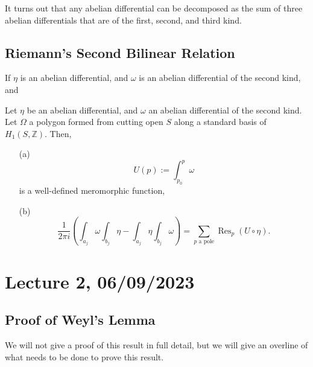 \documentclass[a4paper]{report}
\theoremstyle{definition}
\theoremstyle{remark}
\theoremstyle{proposition}
\theoremstyle{conjecture}
\theoremstyle{lemma}
\theoremstyle{corollary}
\theoremstyle{exercise}
\theoremstyle{example}
\newcommand{\diff}{\,\mathrm{d}}
\newcommand{\on}{\operatorname}
\begin{document}
It turns out that any abelian differential can be decomposed as the sum 
of three abelian differentials that are of the first, second, and third
kind.

\subsection{Riemann's Second Bilinear Relation}

If $\eta$ is an abelian differential, and $\omega$ is an abelian differential
of the second kind, and 

\begin{theorem}
    Let $\eta$ be an abelian differential, and $\omega$ an abelian
    differential of the second kind. Let $\Omega$ a polygon formed from 
    cutting open $S$ along a standard basis of $H_1(S,\mathbb{Z})$.
    Then,
    \begin{itemize}
        \item[(a)] $$U(p) := \int_{p_0}^p \omega$$ is a well-defined
            meromorphic function,
        \item[(b)] $$\frac{1}{2\pi i}\left(\int_{a_j}\omega\int_{b_j}\eta - \int_{a_j}\eta \int_{b_j}\omega \right)=\sum_{\text{$p$ a pole}} \on{Res}_p(U\circ \eta).$$ 
    \end{itemize}
\end{theorem}

\section{Lecture 2, 06/09/2023}

\subsection{Proof of Weyl's Lemma}

We will not give a proof of this result in full detail, but we will give 
an overline of what needs to be done to prove this result.
\end{document}
